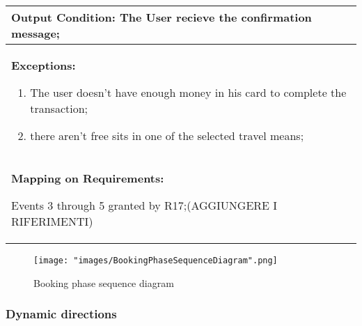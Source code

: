 \begin{longtable}{|p{14cm}|}
\textbf{Output Condition:} The User recieve the confirmation message; \\ \hline

\textbf{Exceptions:}

\begin{enumerate}
\item The user doesn't have enough money in his card to complete the transaction;
\item there aren't free sits in one of the selected travel means; 
\end{enumerate} \\ \hline

\textbf{Mapping on Requirements:}

Events 3 through 5 granted by R17;(AGGIUNGERE I RIFERIMENTI) \\ \hline

\end{longtable}

\begin{figure}[H]
\begin{center}
\texttt{[image: "images/BookingPhaseSequenceDiagram".png]}
\caption{Booking phase sequence diagram}
\label{img:seqDiagrAppEditing00}
\end{center}
\end{figure}

\subsubsection{Dynamic directions} \label{usecase:Dynamic Directions}

